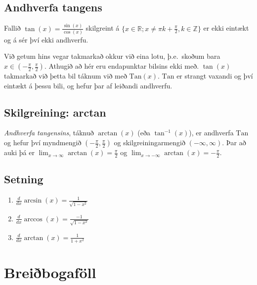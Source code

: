 \documentclass[b5paper,11pt,icelandic]{sphinxmanual}
\begin{document}
\subsection{Andhverfa tangens}
\label{kafli04:andhverfa-tangens}
Fallið \(\tan(x) = \frac{\sin(x)}{\cos(x)}\) skilgreint á
\(\{x \in {{\mathbb  R}}; x \neq \pi k + \frac \pi 2, k \in {{\mathbb Z}}\}\)
er ekki eintækt og á sér því ekki andhverfu.

Við getum hins vegar takmarkað okkur við eina lotu, þ.e. skoðum bara
\(x\in (-\frac \pi 2, \frac \pi 2)\). Athugið að hér eru endapunktar
bilsins ekki með. \(\tan(x)\) takmarkað við þetta bil táknum við með
\({{\text{Tan}}}(x)\). \({{\text{Tan}}}\) er strangt vaxandi og
því eintækt á þessu bili, og hefur þar af leiðandi andhverfu.


\subsection{Skilgreining: arctan}
\label{kafli04:skilgreining-arctan}
\emph{Andhverfa tangensins}, táknuð \(\arctan(x)\) (eða
\(\tan^{-1}(x)\)), er andhverfa \({{\text{Tan}}}\) og hefur því
myndmengið \((-\frac \pi 2,
\frac \pi 2)\) og skilgreiningarmengið \((-\infty,\infty)\). Þar að
auki þá er
\(\lim_{x\to \infty} \arctan(x) = \frac \pi 2\) og
\(\lim_{x\to -\infty} \arctan(x) = -\frac \pi 2\).



\subsection{Setning}
\label{kafli04:id7}\begin{enumerate}
\item {} 
\(\frac d{dx} \arcsin(x) = \frac 1{\sqrt{1-x^2}}\)

\item {} 
\(\frac d{dx} \arccos(x) = \frac {-1}{\sqrt{1-x^2}}\)

\item {} 
\(\frac d{dx} \arctan(x) = \frac 1{1+x^2}\)

\end{enumerate}


\section{Breiðbogaföll}
\label{kafli04:breibogafoll}
\end{document}
